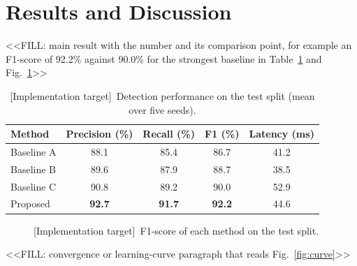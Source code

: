 \documentclass[conference]{IEEEtran}
\newcommand{\tgt}[1]{\textcolor{tgtblue}{#1}}
\newcommand{\tgtcap}{\textcolor{tgtblue}{[Implementation target]}~}
\begin{document}
\section{Results and Discussion}\label{sec:results}
<<FILL: main result with the number and its comparison point, for example an F1-score of \tgt{92.2}\% against \tgt{90.0}\% for the strongest baseline in Table~\ref{tab:main} and Fig.~\ref{fig:bars}>>

\begin{table}[t]
\centering
\caption{\tgtcap Detection performance on the test split (mean over five seeds).}
\label{tab:main}
\setlength{\tabcolsep}{4pt}
\begin{tabular}{@{}lcccc@{}}
\toprule
Method & Precision (\%) & Recall (\%) & F1 (\%) & Latency (ms) \\
\midrule
Baseline A & \tgt{88.1} & \tgt{85.4} & \tgt{86.7} & \tgt{41.2} \\
Baseline B & \tgt{89.6} & \tgt{87.9} & \tgt{88.7} & \tgt{38.5} \\
Baseline C & \tgt{90.8} & \tgt{89.2} & \tgt{90.0} & \tgt{52.9} \\
Proposed & \textbf{\tgt{92.7}} & \textbf{\tgt{91.7}} & \textbf{\tgt{92.2}} & \tgt{44.6} \\
\bottomrule
\end{tabular}
\end{table}

\begin{figure}[t]
\centering
{}
\caption{\tgtcap F1-score of each method on the test split.}
\label{fig:bars}
\end{figure}

<<FILL: convergence or learning-curve paragraph that reads Fig.~\ref{fig:curve}>>
\end{document}
